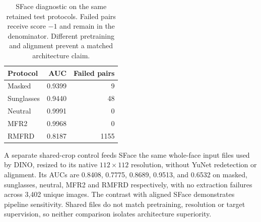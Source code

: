\documentclass[10pt,journal,compsoc]{IEEEtran}
\begin{document}
\begin{table}[t]
\centering
\caption{SFace diagnostic on the same retained test protocols. Failed pairs receive score $-1$ and remain in the denominator. Different pretraining and alignment prevent a matched architecture claim.}
\label{tab:sface}
\begin{tabular}{lrr}
\toprule
Protocol & AUC & Failed pairs\\
\midrule
Masked & 0.9399 & 9\\
Sunglasses & 0.9440 & 48\\
Neutral & 0.9991 & 0\\
MFR2 & 0.9968 & 0\\
RMFRD & 0.8187 & 1155\\
\bottomrule
\end{tabular}
\end{table}
A separate shared-crop control feeds SFace the same whole-face input files used by DINO, resized to its native $112\!\times\!112$ resolution, without YuNet redetection or alignment. Its AUCs are 0.8408, 0.7775, 0.8689, 0.9513, and 0.6532 on masked, sunglasses, neutral, MFR2 and RMFRD respectively, with no extraction failures across 3,402 unique images. The contrast with aligned SFace demonstrates pipeline sensitivity. Shared files do not match pretraining, resolution or target supervision, so neither comparison isolates architecture superiority.
\end{document}
